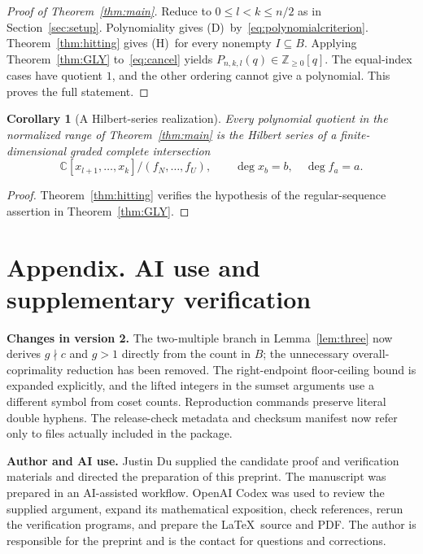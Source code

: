 \documentclass[11pt,a4paper]{article}
\numberwithin{equation}{section}
\newtheorem{corollary}[theorem]{Corollary}
\theoremstyle{remark}
\newcommand{\Nzero}{\mathbb Z_{\ge 0}}
\newcommand{\C}{\mathbb C}
\newcommand{\Dcond}{\textup{(D)}}
\newcommand{\Hcond}{\textup{(H)}}
\begin{document}
\begin{proof}[Proof of Theorem~\ref{thm:main}]
Reduce to $0\le l<k\le n/2$ as in Section~\ref{sec:setup}.
Polynomiality gives \Dcond\ by~\eqref{eq:polynomialcriterion}.
Theorem~\ref{thm:hitting} gives \Hcond\ for every nonempty
$I\subseteq B$.
Applying Theorem~\ref{thm:GLY} to~\eqref{eq:cancel} yields
$P_{n,k,l}(q)\in\Nzero[q]$.
The equal-index cases have quotient $1$, and the other ordering
cannot give a polynomial. This proves the full statement.
\end{proof}

\begin{corollary}[A Hilbert-series realization]\label{cor:hilbert}
Every polynomial quotient in the normalized range of
Theorem~\ref{thm:main} is the Hilbert series of a finite-dimensional
graded complete intersection
\[
  \C[x_{l+1},\ldots,x_k]/(f_N,\ldots,f_U),
  \qquad \deg x_b=b,\quad \deg f_a=a.
\]
\end{corollary}

\begin{proof}
Theorem~\ref{thm:hitting} verifies the hypothesis of the
regular-sequence assertion in Theorem~\ref{thm:GLY}.
\end{proof}

\section*{Appendix. AI use and supplementary verification}

\textbf{Changes in version 2.}
The two-multiple branch in Lemma~\ref{lem:three} now derives
$g\nmid c$ and $g>1$ directly from the count in $B$; the unnecessary
overall-coprimality reduction has been removed.
The right-endpoint floor-ceiling bound is expanded explicitly, and the
lifted integers in the sumset arguments use a different symbol from
coset counts. Reproduction commands preserve literal double hyphens.
The release-check metadata and checksum manifest now refer only to files
actually included in the package.

\textbf{Author and AI use.}
Justin Du supplied the candidate proof and verification materials and
directed the preparation of this preprint.
The manuscript was prepared in an AI-assisted workflow.
OpenAI Codex was used to review the supplied argument, expand its
mathematical exposition, check references, rerun the verification programs,
and prepare the \LaTeX\ source and PDF.
The author is responsible for the preprint and is the contact for
questions and corrections.
\end{document}
